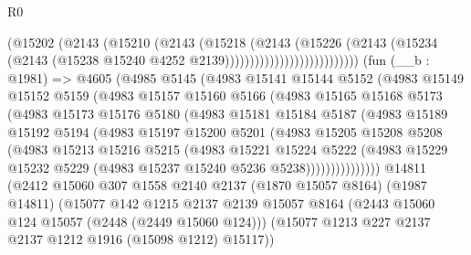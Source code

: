 \begin{lexlean}{R0}
\begin{coremodule}
                                    (@15202
                                      (@2143
                                        (@15210
                                          (@2143
                                            (@15218
                                              (@2143
                                                (@15226
                                                  (@2143
                                                    (@15234
                                                      (@2143
                                                        (@15238
                                                          @15240
                                                          @4252
                                                          @2139)))))))))))))))))))))))))))
    (fun (__b : @1981) =>
    @4605
      (@4985
        @5145
        (@4983
          @15141
          @15144
          @5152
          (@4983
            @15149
            @15152
            @5159
            (@4983
              @15157
              @15160
              @5166
              (@4983
                @15165
                @15168
                @5173
                (@4983
                  @15173
                  @15176
                  @5180
                  (@4983
                    @15181
                    @15184
                    @5187
                    (@4983
                      @15189
                      @15192
                      @5194
                      (@4983
                        @15197
                        @15200
                        @5201
                        (@4983
                          @15205
                          @15208
                          @5208
                          (@4983
                            @15213
                            @15216
                            @5215
                            (@4983
                              @15221
                              @15224
                              @5222
                              (@4983
                                @15229
                                @15232
                                @5229
                                (@4983 @15237 @15240 @5236 @5238)))))))))))))))
    @14811
    (@2412
      @15060
      @307
      @1558
      @2140
      @2137
      (@1870 @15057 @8164)
      (@1987 @14811)
      (@15077
        @142
        @1215
        @2137
        @2139
        @15057
        @8164
        (@2443 @15060 @124 @15057 (@2448 (@2449 @15060 @124)))
        (@15077 @1213 @227 @2137 @2137 @1212 @1916 (@15098 @1212) @15117))

\end{coremodule}
\end{lexlean}
